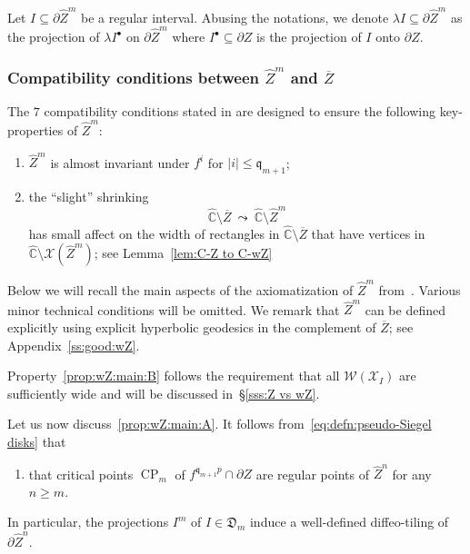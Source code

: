\documentclass[11pt, reqno]{amsart}
\numberwithin{equation}{section}
\theoremstyle{plain}
\theoremstyle{theorem}
\theoremstyle{plain}
\theoremstyle{definition}
\DeclareMathOperator{\CP}{CP}
\numberwithin{figure}{section}
\newcommand{\wC}{\widehat{\mathbb{C}}}
\newcommand{\Width}{{\mathcal W}}
\newcommand\XX{\mathcal{X}}
\newcommand{\wZ}{{\widehat Z}}
\newcommand{\qq}{\mathfrak{q}}
\begin{document}
Let $I \subseteq \partial \widehat Z^m$ be a regular interval.
Abusing the notations, we denote $\lambda I\subseteq \partial \widehat Z^m$ as the projection of $\lambda I^\bullet$ on $\partial \widehat Z^m$ where $I^\bullet \subseteq \partial Z$ is the projection of $I$ onto $\partial Z$.

\subsubsection{Compatibility conditions between $\wZ^m$ and $\overline Z$} \label{sss:compart:wZ} The $7$ compatibility conditions stated in \cite[\S~5.1]{DL22} are designed to ensure the following key-properties of $\wZ^m$:
\begin{enumerate}[label=(\Alph*)]
  \item\label{prop:wZ:main:A} $\wZ^m$ is almost invariant under $f^{i}$ for $|i|\le \qq_{m+1}$;
   \item\label{prop:wZ:main:B} the ``slight'' shrinking 
   \[ \wC\setminus \overline Z\ \leadsto \ \wC\setminus \wZ^m \]
  has small affect on the width of rectangles in $\wC\setminus \overline Z$ that have vertices in $\wC\setminus \XX(\wZ^m)$; see Lemma~\ref{lem:C-Z to C-wZ}
\end{enumerate}

Below we will recall the main aspects of the axiomatization of $\wZ^m$ from~\cite[\S~5.1]{DL22}. Various minor technical conditions will be omitted. We remark that $\wZ^m$ can be defined explicitly using explicit hyperbolic geodesics in the complement of $\overline Z$; see Appendix~\ref{ss:good:wZ}.

Property~\ref{prop:wZ:main:B} follows the requirement that all $\Width(\XX_I)$ are sufficiently wide and will be discussed in~\S\ref{sss:Z vs wZ}. 

Let us now discuss~\ref{prop:wZ:main:A}. It follows from~\eqref{eq:defn:pseudo-Siegel disks} that
\begin{enumerate}[label=(\Alph*), start=3]
  \item\label{prop:wZ:main:C} that critical points $\CP_m$ of $f^{\mathfrak{q}_{m+1}p}\cap \partial Z$ are regular points of $\wZ^n$ for any $n\ge m$. 
\end{enumerate}
In particular, the projections $I^m$ of $I\in \mathfrak D_m$ induce a well-defined diffeo-tiling of $\partial \wZ^n$. 
\end{document}
